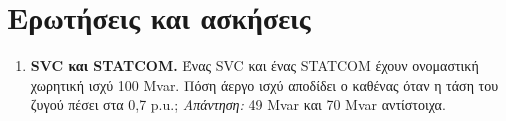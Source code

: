 
\section{Ερωτήσεις και ασκήσεις}

\begin{enumerate}
\item \textbf{SVC και STATCOM.} Ένας SVC και ένας STATCOM έχουν ονομαστική χωρητική ισχύ
      100 Mvar. Πόση άεργο ισχύ αποδίδει ο καθένας όταν η τάση του ζυγού πέσει στα 0,7 p.u.;
      \emph{Απάντηση:} 49 Mvar και 70 Mvar αντίστοιχα.
\end{enumerate}

